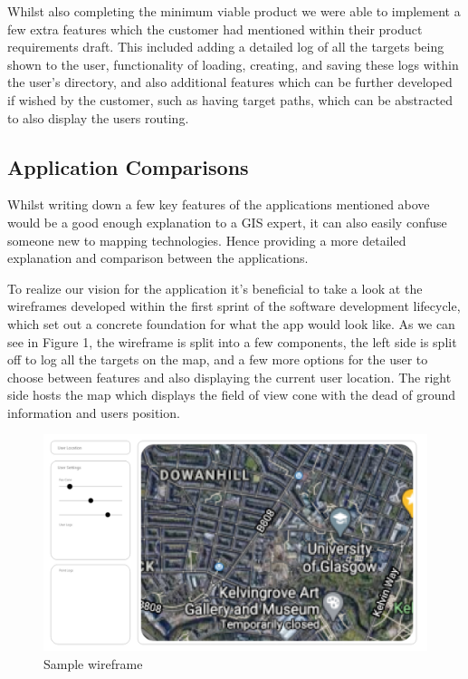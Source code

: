 \documentclass{l3proj}
\begin{document}
Whilst also completing the minimum viable product we were able to implement a few extra features which the customer had mentioned within their product requirements draft. This included adding a detailed log of all the targets being shown to the user, functionality of loading, creating, and saving these logs within the user's directory, and also additional features which can be further developed if wished by the customer, such as having target paths, which can be abstracted to also display the users routing.

\subsection{Application Comparisons}

Whilst writing down a few key features of the applications mentioned above would be a good enough explanation to a GIS expert, it can also easily confuse someone new to mapping technologies. Hence providing a more detailed explanation and comparison between the applications.

To realize our vision for the application it's beneficial to take a look at the wireframes developed within the first sprint of the software development lifecycle, which set out a concrete foundation for what the app would look like. As we can see in Figure 1, the wireframe is split into a few components, the left side is split off to log all the targets on the map, and a few more options for the user to choose between features and also displaying the current user location. The right side hosts the map which displays the field of view cone with the dead of ground information and users position.

\begin{figure}[!h]
    \caption{Sample wireframe}
    \centering
    \includegraphics[width=\textwidth]{wireframe.jpg}
\end{figure}
\end{document}
